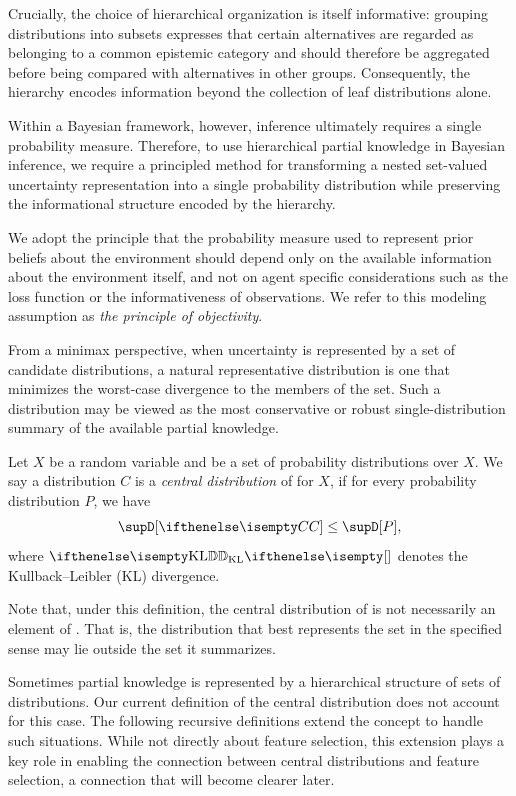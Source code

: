 Crucially, the choice of hierarchical organization is itself informative: grouping distributions into subsets
expresses that certain alternatives are regarded as belonging to a common epistemic category and should therefore be
aggregated before being compared with alternatives in other groups.
Consequently, the hierarchy encodes information beyond the collection of leaf distributions alone.

Within a Bayesian framework, however, inference ultimately requires a single probability measure.
Therefore, to use hierarchical partial knowledge in Bayesian inference, we require a principled method for
transforming a nested set-valued uncertainty representation into a single probability distribution while preserving
the informational structure encoded by the hierarchy.

We adopt the principle that the probability measure used to represent prior beliefs about the environment should
depend only on the available information about the environment itself, and not on agent specific considerations such as
the loss function or the informativeness of observations.
We refer to this modeling assumption as \emph{the principle of objectivity}.

From a minimax perspective, when uncertainty is represented by a set of candidate distributions, a natural
representative distribution is one that minimizes the worst-case divergence to the members of the set.
Such a distribution may be viewed as the most conservative or robust single-distribution summary of the available
partial knowledge.

\begin{definition}
    Let $X$ be a random variable and \setQ be a set of probability distributions over $X$.
    We say a distribution $C$ is a \emph{central distribution} of \setQ for $X$, if for every probability
    distribution $P$, we have
    \begin{equation}
        \supD[\cDist] \leq \supD[P],
        \label{eq:central-def}
    \end{equation}
    where $\measure{D}{\mathrm{KL}}{}$ denotes the Kullback–Leibler (KL) divergence.
\end{definition}

Note that, under this definition, the central distribution of \setQ is not necessarily an element of \setQ.
That is, the distribution that best represents the set in the specified sense may lie outside the set it summarizes.

Sometimes partial knowledge is represented by a hierarchical structure of sets of distributions.
Our current definition of the central distribution does not account for this case.
The following recursive definitions extend the concept to handle such situations.
While not directly about feature selection, this extension plays a key role in enabling the connection between
central distributions and feature selection, a connection that will become clearer later.

